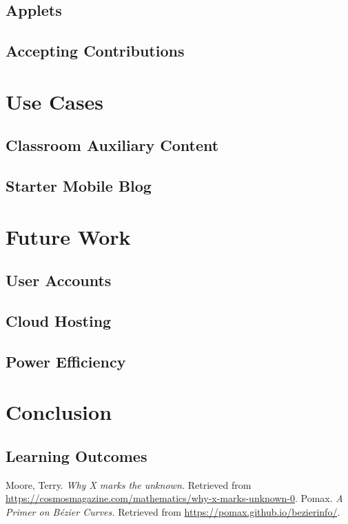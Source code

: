 \documentclass[12pt]{report}
\begin{document}
    \section{Applets}
    \section{Accepting Contributions}

\chapter{Use Cases}
    \section{Classroom Auxiliary Content}
    \section{Starter Mobile Blog}

\chapter{Future Work}
    \section{User Accounts}
    \section{Cloud Hosting}
    \section{Power Efficiency}

\chapter{Conclusion}
    \section{Learning Outcomes}

\begin{thebibliography}{9}
     Moore, Terry. \textit{Why X marks the unknown.} Retrieved
        from \url{https://cosmosmagazine.com/mathematics/why-x-marks-unknown-0}.
     Pomax. \textit{A Primer on Bézier Curves.} Retrieved from
        \url{https://pomax.github.io/bezierinfo/}.
\end{thebibliography}
\end{document}
